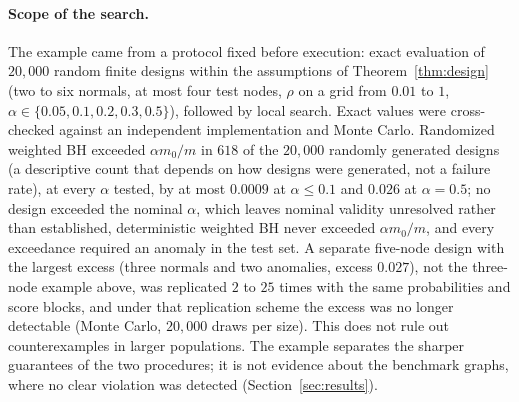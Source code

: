\paragraph{Scope of the search.}
The example came from a protocol fixed before execution: exact evaluation of $20{,}000$ random finite designs within the assumptions of Theorem~\ref{thm:design} (two to six normals, at most four test nodes, $\rho$ on a grid from $0.01$ to $1$, $\alpha\in\{0.05,0.1,0.2,0.3,0.5\}$), followed by local search. Exact values were cross-checked against an independent implementation and Monte Carlo. Randomized weighted BH exceeded $\alpha m_0/m$ in $618$ of the $20{,}000$ randomly generated designs (a descriptive count that depends on how designs were generated, not a failure rate), at every $\alpha$ tested, by at most $0.0009$ at $\alpha\le0.1$ and $0.026$ at $\alpha=0.5$; no design exceeded the nominal $\alpha$, which leaves nominal validity unresolved rather than established, deterministic weighted BH never exceeded $\alpha m_0/m$, and every exceedance required an anomaly in the test set. A separate five-node design with the largest excess (three normals and two anomalies, excess $0.027$), not the three-node example above, was replicated $2$ to $25$ times with the same probabilities and score blocks, and under that replication scheme the excess was no longer detectable (Monte Carlo, $20{,}000$ draws per size). This does not rule out counterexamples in larger populations. The example separates the sharper guarantees of the two procedures; it is not evidence about the benchmark graphs, where no clear violation was detected (Section~\ref{sec:results}).

